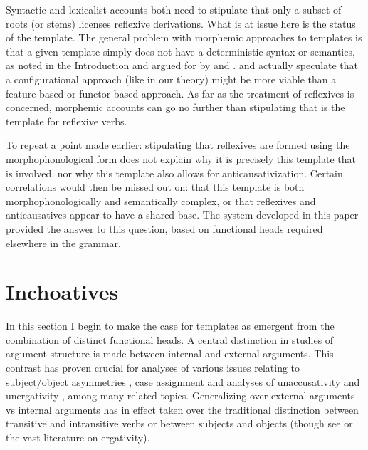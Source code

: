 Syntactic and lexicalist accounts both need to stipulate that only a subset of roots (or stems) licenses reflexive derivations. What is at issue here is the status of the template. The general problem with morphemic approaches to templates is that a given template simply does not have a deterministic syntax or semantics, as noted in the Introduction and argued for by \cite{doron03} and \cite{kastner16phd}. \citet[198]{arad05} and \citet[564]{borer13oup} actually speculate that a configurational approach (like in our theory) might be more viable than a feature-based or functor-based approach. As far as the treatment of reflexives is concerned, morphemic accounts can go no further than stipulating that {\thit} is the template for reflexive verbs.

To repeat a point made earlier: stipulating that reflexives are formed using the morphophonological form {\thit} does not explain why it is precisely this template that is involved, nor why this template also allows for anticausativization. Certain correlations would then be missed out on: that this template is both morphophonologically and semantically complex, or that reflexives and anticausatives appear to have a shared base. The system developed in this paper provided the answer to this question, based on functional heads required elsewhere in the grammar.


\section{Inchoatives}

In this section I begin to make the case for templates as emergent from the combination of distinct functional heads. A central distinction in studies of argument structure is made between internal and external arguments. This contrast has proven crucial for analyses of various issues relating to subject/object asymmetries \citep{marantz84,kratzer96}, case assignment \citep{burzio86,marantz91} and analyses of unaccusativity and unergativity \citep{perlmutter78}, among many related topics. Generalizing over external arguments vs internal arguments has in effect taken over the traditional distinction between transitive and intransitive verbs or between subjects and objects (though see \citealt{legate14}{ or the vast literature on ergativity}).{}

